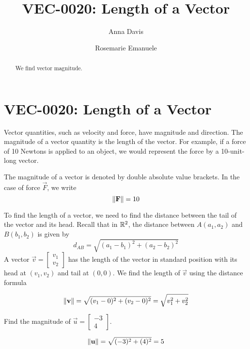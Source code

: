 \documentclass{ximera}
\author{Anna Davis \and Rosemarie Emanuele} \title{VEC-0020:  Length of a Vector} \license{CC-BY 4.0}
\begin{document}
\begin{abstract}
 We find vector magnitude.
\end{abstract}
\maketitle

\section*{VEC-0020:  Length of a Vector}

Vector quantities, such as velocity and force, have magnitude and direction.  The magnitude of a vector quantity is the length of the vector.  For example, if a force of 10 Newtons is applied to an object, we would represent the force by a 10-unit-long vector.

 \begin{center}
\end{center}

The magnitude of a vector is denoted by double absolute value brackets.  In the case of force $\vec{F}$, we write $$\left\lVert\mathbf{F}\right\rVert=10$$

To find the length of a vector, we need to find the distance between the tail of the vector and its head.  Recall that in $\mathbb{R}^2$, the distance between $A(a_1, a_2)$ and $B(b_1, b_2)$ is given by 
\begin{equation*}
d_{AB}=\sqrt{(a_1-b_1)^2+(a_2-b_2)^2}
\end{equation*}
A vector $\vec{v}=\begin{bmatrix}v_1\\ v_2\end{bmatrix}$ has the length of  the vector in standard position with its head at $(v_1, v_2)$ and tail at $(0, 0)$. We find the length of $\vec{v}$ using the distance formula

\begin{equation}\label{eq:normr2}
\left\lVert\mathbf{v}\right\rVert=\sqrt{(v_1-0)^2+(v_2-0)^2}=\sqrt{v_1^2+v_2^2}
\end{equation}

\begin{example}\label{ex:findmaginr2} Find the magnitude of $\vec{u}=\begin{bmatrix}-3\\4\end{bmatrix}$.  
\begin{center}
\end{center}
\begin{explanation}

 $$
\left\lVert\mathbf{u}\right\rVert=\sqrt{(-3)^2+(4)^2}=5
$$
\end{explanation}
\end{example}
\end{document}
